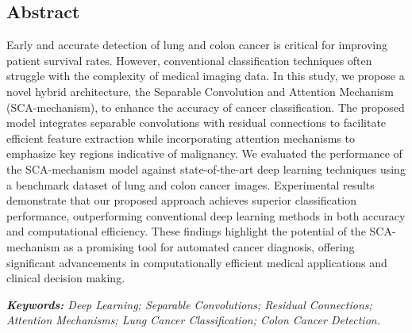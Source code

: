 \begin{center}
    \section*{Abstract}
\end{center}
Early and accurate detection of lung and colon cancer is critical for improving patient survival rates. However, conventional classification techniques often struggle with the complexity of medical imaging data. In this study, we propose a novel hybrid architecture, the Separable Convolution and Attention Mechanism (SCA-mechanism), to enhance the accuracy of cancer classification. The proposed model integrates separable convolutions with residual connections to facilitate efficient feature extraction while incorporating attention mechanisms to emphasize key regions indicative of malignancy. We evaluated the performance of the SCA-mechanism model against state-of-the-art deep learning techniques using a benchmark dataset of lung and colon cancer images. Experimental results demonstrate that our proposed approach achieves superior classification performance, outperforming conventional deep learning methods in both accuracy and computational efficiency. These findings highlight the potential of the SCA-mechanism as a promising tool for automated cancer diagnosis, offering significant advancements in computationally efficient medical applications and clinical decision making.

\vspace{5mm}

\textit{\textbf{Keywords:} Deep Learning; Separable Convolutions; Residual Connections; Attention Mechanisms; Lung Cancer Classification; Colon Cancer Detection.}